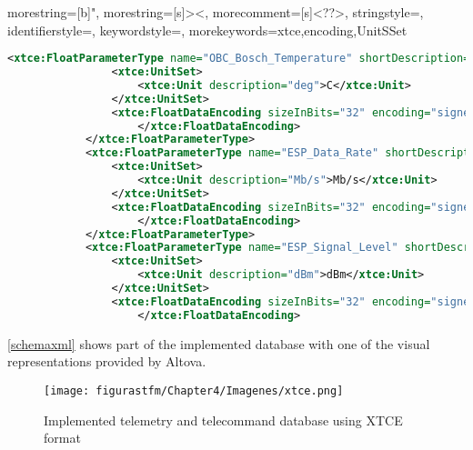 {
  morestring=[b]",
  morestring=[s]{>}{<},
  morecomment=[s]{<?}{?>},
  stringstyle=\color{black},
  identifierstyle=\color{darkblue},
  keywordstyle=\color{cyan},
  morekeywords={xtce,encoding,UnitSSet}%
}

\begin{lstlisting}[language=XML, caption=Example of telemetry implemented using XTCE, label={codigoxml}]
<xtce:FloatParameterType name="OBC_Bosch_Temperature" shortDescription="OBC_Bosch_Temperature" signed="true">
				<xtce:UnitSet>
					<xtce:Unit description="deg">C</xtce:Unit>
				</xtce:UnitSet>
				<xtce:FloatDataEncoding sizeInBits="32" encoding="signed" bitOrder="LITTLE_ENDIAN">
					</xtce:FloatDataEncoding>
			</xtce:FloatParameterType>
			<xtce:FloatParameterType name="ESP_Data_Rate" shortDescription="ESP_Data_Rate" signed="true">
				<xtce:UnitSet>
					<xtce:Unit description="Mb/s">Mb/s</xtce:Unit>
				</xtce:UnitSet>
				<xtce:FloatDataEncoding sizeInBits="32" encoding="signed" bitOrder="LITTLE_ENDIAN">
					</xtce:FloatDataEncoding>
			</xtce:FloatParameterType>
			<xtce:FloatParameterType name="ESP_Signal_Level" shortDescription="ESP_Signal_Level" signed="true">
				<xtce:UnitSet>
					<xtce:Unit description="dBm">dBm</xtce:Unit>
				</xtce:UnitSet>
				<xtce:FloatDataEncoding sizeInBits="32" encoding="signed" bitOrder="LITTLE_ENDIAN">
					</xtce:FloatDataEncoding>

\end{lstlisting}

\autoref{schemaxml} shows part of the implemented database with one of the visual representations provided by Altova.

\begin{figure} [H]
			\centering
			\texttt{[image: figurastfm/Chapter4/Imagenes/xtce.png]}
			\caption{Implemented telemetry and telecommand database using \acrshort{XTCE} format} \label{schemaxml}
\end{figure}



